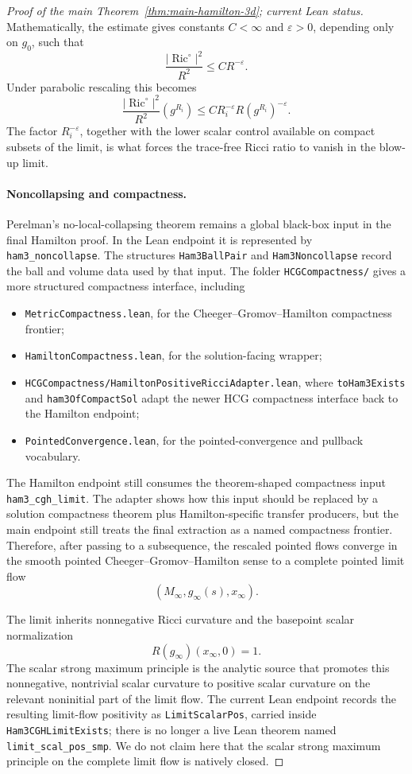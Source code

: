 \documentclass[11pt]{article}
\theoremstyle{plain}
\theoremstyle{definition}
\theoremstyle{remark}
\newcommand{\Ric}{\operatorname{Ric}}
\newcommand{\norm}[1]{\left|#1\right|}
\newcommand{\eps}{\varepsilon}
\newcommand{\leanref}[1]{\nolinkurl{#1}}
\newcommand{\leanfile}[1]{\nolinkurl{#1}}
\newcommand{\rffile}[1]{\leanfile{#1}}
\newcommand{\rfdir}[1]{\leanfile{#1/}}
\begin{document}
\begin{proof}[Proof of the main Theorem~\ref{thm:main-hamilton-3d}; current Lean status]
Mathematically, the estimate gives constants \(C<\infty\) and \(\eps>0\),
depending only on \(g_0\), such that
\[
\frac{\norm{\Ric^\circ}^2}{R^2}\le C R^{-\eps}.
\]
Under parabolic rescaling this becomes
\[
\frac{\norm{\Ric^\circ}^2}{R^2}(g^{R_i})
\le
C R_i^{-\eps}R(g^{R_i})^{-\eps}.
\]
The factor \(R_i^{-\eps}\), together with the lower scalar control available on
compact subsets of the limit, is what forces the trace-free Ricci ratio to
vanish in the blow-up limit.

\paragraph{Noncollapsing and compactness.}
Perelman's no-local-collapsing theorem remains a global black-box input in the final
Hamilton proof.  In the Lean endpoint it is represented by
\leanref{ham3_noncollapse}.  The structures \leanref{Ham3BallPair} and
\leanref{Ham3Noncollapse} record the ball and volume data used by that input.
The folder \rfdir{HCGCompactness} gives a more structured compactness
interface, including
\begin{itemize}[leftmargin=2em]
  \item \rffile{MetricCompactness.lean}, for the Cheeger--Gromov--Hamilton compactness
    frontier;
  \item \rffile{HamiltonCompactness.lean}, for the solution-facing wrapper;
  \item \rffile{HCGCompactness/HamiltonPositiveRicciAdapter.lean}, where
    \leanref{toHam3Exists} and \leanref{ham3OfCompactSol} adapt the newer HCG
    compactness interface back to the Hamilton endpoint;
  \item \rffile{PointedConvergence.lean}, for the pointed-convergence and
    pullback vocabulary.
\end{itemize}
The Hamilton endpoint still consumes the theorem-shaped compactness input
\leanref{ham3_cgh_limit}.  The adapter shows how this input should be replaced
by a solution compactness theorem plus Hamilton-specific transfer producers,
but the main endpoint still treats the final extraction as a named compactness
frontier.  Therefore, after passing to a subsequence, the rescaled pointed
flows converge in the smooth pointed
Cheeger--Gromov--Hamilton sense to a complete pointed limit flow
\[
(M_\infty,g_\infty(s),x_\infty).
\]

The limit inherits nonnegative Ricci curvature and the basepoint scalar
normalization
\[
R(g_\infty)(x_\infty,0)=1.
\]
The scalar strong maximum principle is the analytic source that promotes this
nonnegative, nontrivial scalar curvature to positive scalar curvature on the
relevant noninitial part of the limit flow.  The current Lean endpoint records
the resulting limit-flow positivity as \leanref{LimitScalarPos}, carried inside
\leanref{Ham3CGHLimitExists}; there is no longer a live Lean theorem named
\texttt{limit\_scal\_pos\_smp}.  We do not claim here that the scalar strong
maximum principle on the complete limit flow is natively closed.


\end{proof}
\end{document}
